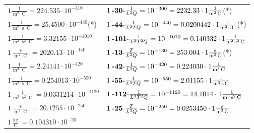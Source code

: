 \begin{center}
\begin{longtable}{l l}
{\color{black}$1 \bm{\mathrm{ }}\frac1{\operatorname{m}^2\operatorname{C}} = 224.535\cdot10^{-310} $}&
	{\color{black}$1\:\text{\textbf{-30}-} \frac1{L^2Q}=10^{-300} = 2232.33 \cdot 1 \bm{\mathrm{ }}\frac1{\operatorname{m}^2\operatorname{C}}$}\quad(*)\\
{\color{black}$1 \bm{\mathrm{ }}\frac1{\operatorname{m}^2\operatorname{s}\operatorname{C}} = 25.4500\cdot10^{-440} $}\quad(*)&
	{\color{black}$1\:\text{\textbf{-44}-} \frac1{L^2TQ}=10^{-440} = 0.0200442 \cdot 1 \bm{\mathrm{ }}\frac1{\operatorname{m}^2\operatorname{s}\operatorname{C}}$}\quad(*)\\
{\color{black}$1 \bm{\mathrm{ }}\frac1{\operatorname{m}^2\operatorname{s}^2\operatorname{C}} = 3.32155\cdot10^{-1010} $}&
	{\color{black}$1\:\text{\textbf{-101}-} \frac1{L^2T^2Q}=10^{-1010} = 0.140332 \cdot 1 \bm{\mathrm{ }}\frac1{\operatorname{m}^2\operatorname{s}^2\operatorname{C}}$}\\
{\color{black}$1 \bm{\mathrm{ }}\frac{\operatorname{s}}{\operatorname{m}^2\operatorname{C}} = 2020.13\cdot10^{-140} $}&
	{\color{black}$1\:\text{\textbf{-13}-} \frac{T}{L^2Q}=10^{-130} = 253.004 \cdot 1 \bm{\mathrm{ }}\frac{\operatorname{s}}{\operatorname{m}^2\operatorname{C}}$}\quad(*)\\
{\color{black}$1 \bm{\mathrm{ }}\frac1{\operatorname{m}^3\operatorname{C}} = 2.24141\cdot10^{-420} $}&
	{\color{black}$1\:\text{\textbf{-42}-} \frac1{L^3Q}=10^{-420} = 0.224030 \cdot 1 \bm{\mathrm{ }}\frac1{\operatorname{m}^3\operatorname{C}}$}\\
{\color{black}$1 \bm{\mathrm{ }}\frac1{\operatorname{m}^3\operatorname{s}\operatorname{C}} = 0.254013\cdot10^{-550} $}&
	{\color{black}$1\:\text{\textbf{-55}-} \frac1{L^3TQ}=10^{-550} = 2.01155 \cdot 1 \bm{\mathrm{ }}\frac1{\operatorname{m}^3\operatorname{s}\operatorname{C}}$}\\
{\color{black}$1 \bm{\mathrm{ }}\frac1{\operatorname{m}^3\operatorname{s}^2\operatorname{C}} = 0.0331214\cdot10^{-1120} $}&
	{\color{black}$1\:\text{\textbf{-112}-} \frac1{L^3T^2Q}=10^{-1120} = 14.1014 \cdot 1 \bm{\mathrm{ }}\frac1{\operatorname{m}^3\operatorname{s}^2\operatorname{C}}$}\\
{\color{black}$1 \bm{\mathrm{ }}\frac{\operatorname{s}}{\operatorname{m}^3\operatorname{C}} = 20.1255\cdot10^{-250} $}&
	{\color{black}$1\:\text{\textbf{-25}-} \frac{T}{L^3Q}=10^{-250} = 0.0253450 \cdot 1 \bm{\mathrm{ }}\frac{\operatorname{s}}{\operatorname{m}^3\operatorname{C}}$}\\
\hline{\color{black}$1 \bm{\mathrm{ }}\frac{\operatorname{kg}}{\operatorname{C}} = 0.104310\cdot10^{-20} $}&

\end{longtable}
\end{center}
